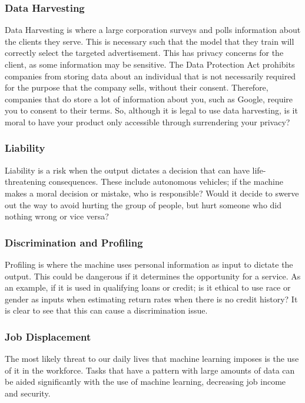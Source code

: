 \subsubsection{Data Harvesting}

Data Harvesting is where a large corporation surveys and polls information about the clients they serve. This is necessary such that the model that they train will correctly select the targeted advertisement. This has privacy concerns for the client, as some information may be sensitive. The Data Protection Act prohibits companies from storing data about an individual that is not necessarily required for the purpose that the company sells, without their consent. Therefore, companies that do store a lot of information about you, such as Google, require you to consent to their terms. So, although it is legal to use data harvesting, is it moral to have your product only accessible through surrendering your privacy?

\subsubsection{Liability}

Liability is a risk when the output dictates a decision that can have life-threatening consequences. These include autonomous vehicles; if the machine makes a moral decision or mistake, who is responsible? Would it decide to swerve out the way to avoid hurting the group of people, but hurt someone who did nothing wrong or vice versa?

\subsubsection{Discrimination and Profiling}

Profiling is where the machine uses personal information as input to dictate the output. 
This could be dangerous if it determines the opportunity for a service. As an example, if it is used in qualifying loans or credit; is it ethical to use race or gender as inputs when estimating return rates when there is no credit history? It is clear to see that this can cause a discrimination issue.\cite{ngcan}

\subsubsection{Job Displacement}

The most likely threat to our daily lives that machine learning imposes is the use of it in the workforce. Tasks that have a pattern with large amounts of data can be aided significantly with the use of machine learning, decreasing job income and security.

